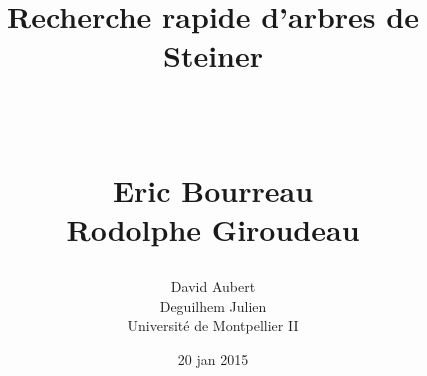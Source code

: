 \documentclass[paper=a4, fontsize=11pt]{scrartcl}	%
\title{ \vspace{-1in} 	\usefont{OT1}{bch}{b}{n}
		\huge \strut Recherche rapide d'arbres de Steiner \strut \\
		\Large \bfseries \strut Eric Bourreau \\ Rodolphe Giroudeau \strut
}
\author{ 									
	\usefont{OT1}{bch}{m}{n} David Aubert\\		
	\usefont{OT1}{bch}{m}{n} Deguilhem Julien\\		
	\usefont{OT1}{bch}{m}{n}Université de  Montpellier II\\	
}
\date{20 jan 2015}
\numberwithin{equation}{section}															%
\numberwithin{figure}{section}																%
\numberwithin{table}{section}																%
\begin{document}
\maketitle







\iffalse
\section{Génération de colonne}
\begin{hspace}{1cm}
La génération
\end{hspace}
de colonne est une méthode pour résoudre les programmes linéaires de grande taille. Pierre Courteille étudiant le sujet, une collaboration sera effectué. Mais les motivations et les interêts sont grand en effet, les approximations succéssives faites pourront être résolues par cette méthode. Une implémentation du simplex ou par combinaison linéaire pourra être faite.


\section{Recherche et approximation}
\begin{hspace}{1cm}
	Le but de ce TER
\end{hspace}
n'est pas de trouvé la solution optimal mais une solution rapide. Une étude sera faite pour déterminer la k-approximation. Lorsque  nous en avons parlé le k varier entre [2..3].
\newline
Ensuite il faudra se décider entre la programmation linéaire, dynamique et par contrainte. Après une sommaire étude entre ces trois éléments, nous pensons que le plus efficace sera la programmation dynamique (A confirmer).



\section{Initialisation}
\begin{hspace}{1cm}
	Ensuite une 
\end{hspace}
des manières de construire un arbre de Steiner serait en suivant l'exemple de la sélection naturelle. Il faudrait construire un réseau génétique afin de faire hériter à chague génération les meilleurs éléments de la précédente. En effet cela semble être une méthode efficace et naturel. De plus, cela semblerait correspondre au type de programmation choisi, pour le moment dynamique.
\newline
Il faudra pouvoir trouver une heuristique efficace pour générer un ensemble déjà suffisament adapté afin de trouver un nombre de génération d'individu minimal.
\fi
\end{document}
